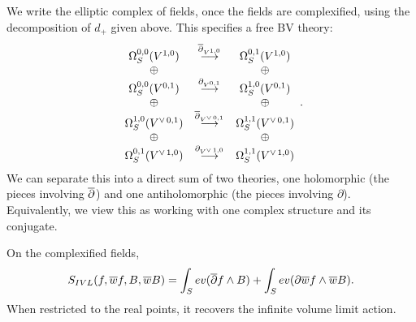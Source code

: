 We write the elliptic complex of fields, once the fields are complexified, using the decomposition of $d_+$ given above. This specifies a free BV theory:
\[
\begin{array}{ccc}
\Omega^{0,0}_S(V^{1,0}) & \overset{\overline{\partial}_{V^{1,0}}}{\longrightarrow} &\Omega^{0,1}_S(V^{1,0})\\
\oplus & & \oplus\\
\Omega^{0,0}_S(V^{0,1}) & \overset{\partial_{V^{0,1}}}{\longrightarrow} &\Omega^{1,0}_S(V^{0,1})\\
\oplus & & \oplus\\
\Omega^{1,0}_S(V^{\vee\,0,1}) & \overset{\overline{\partial}_{V^{\vee\,0,1}}}{\longrightarrow} & \Omega^{1,1}_S(V^{\vee\,0,1})\\
\oplus & & \oplus\\
\Omega^{0,1}_S(V^{\vee\,1,0}) & \overset{\partial_{V^{\vee\,1,0}}}{\longrightarrow} & \Omega^{1,1}_S(V^{\vee\,1,0})\\
\end{array}.
\]
We can separate this into a direct sum of two theories, one holomorphic (the pieces involving $\overline{\partial}$) and one antiholomorphic (the pieces involving $\partial$). Equivalently, we view this as working with one complex structure and its conjugate.

\begin{lemma}
On the complexified fields,
\[
S_{IVL}(f, \overline{w}{f}, B, \overline{w}{B}) = \int_S ev(\overline{\partial} f \wedge B) + \int_S ev(\partial \overline{w}{f} \wedge \overline{w}{B}).
\]
When restricted to the real points, it recovers the infinite volume limit action.
\end{lemma}